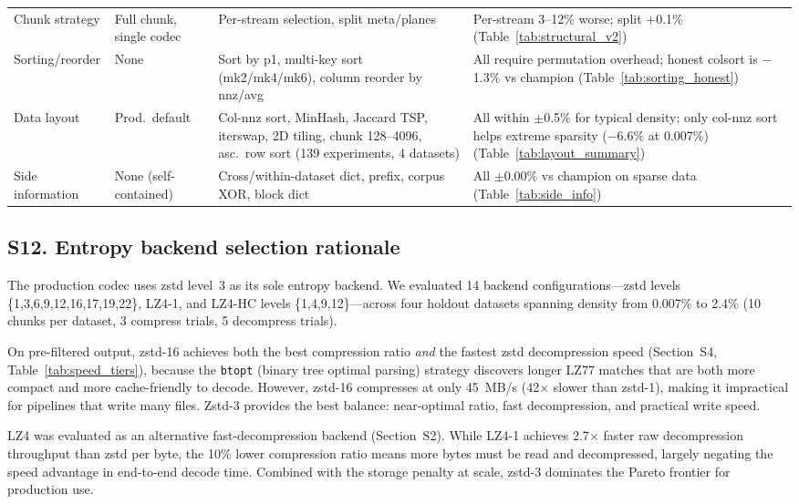 \documentclass[10pt,twocolumn,letterpaper]{article}
\begin{document}
\begin{table}[h]
\begin{tabular}{p{2.8cm} p{2.2cm} p{3.5cm} p{5.5cm}}
Chunk strategy & Full chunk, single codec & Per-stream selection, split meta/planes & Per-stream 3--12\% worse; split +0.1\% (Table~\ref{tab:structural_v2}) \\[3pt]
Sorting/reorder & None & Sort by p1, multi-key sort (mk2/mk4/mk6), column reorder by nnz/avg & All require permutation overhead; honest colsort is $-$1.3\% vs champion (Table~\ref{tab:sorting_honest}) \\[3pt]
Data layout & Prod.\ default & Col-nnz sort, MinHash, Jaccard TSP, iterswap, 2D tiling, chunk 128--4096, asc.\ row sort (139 experiments, 4 datasets) & All within $\pm$0.5\% for typical density; only col-nnz sort helps extreme sparsity ($-$6.6\% at 0.007\%) (Table~\ref{tab:layout_summary}) \\[3pt]
Side information & None (self-contained) & Cross/within-dataset dict, prefix, corpus XOR, block dict & All $\pm$0.00\% vs champion on sparse data (Table~\ref{tab:side_info}) \\
\bottomrule
\end{tabular}
\end{table}

\subsection*{S12. Entropy backend selection rationale}

The production codec uses zstd level~3 as its sole entropy backend.
We evaluated 14 backend configurations---zstd levels \{1,3,6,9,12,16,17,19,22\}, LZ4-1, and LZ4-HC levels \{1,4,9,12\}---across four holdout datasets spanning density from 0.007\% to 2.4\% (10 chunks per dataset, 3 compress trials, 5 decompress trials).

On pre-filtered output, zstd-16 achieves both the best compression ratio \emph{and} the fastest zstd decompression speed (Section~S4, Table~\ref{tab:speed_tiers}), because the \texttt{btopt} (binary tree optimal parsing) strategy discovers longer LZ77 matches that are both more compact and more cache-friendly to decode.
However, zstd-16 compresses at only 45~MB/s (42$\times$ slower than zstd-1), making it impractical for pipelines that write many files.
Zstd-3 provides the best balance: near-optimal ratio, fast decompression, and practical write speed.

LZ4 was evaluated as an alternative fast-decompression backend (Section~S2).
While LZ4-1 achieves 2.7$\times$ faster raw decompression throughput than zstd per byte, the 10\% lower compression ratio means more bytes must be read and decompressed, largely negating the speed advantage in end-to-end decode time.
Combined with the storage penalty at scale, zstd-3 dominates the Pareto frontier for production use.
\end{document}
